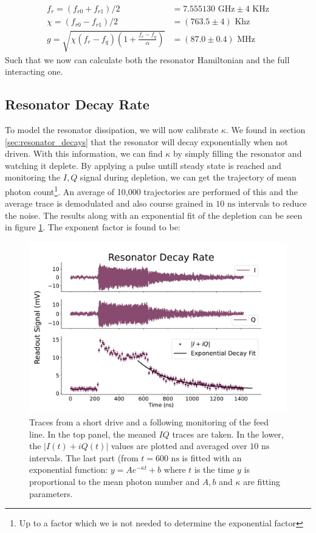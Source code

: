 \begin{align}
    f_r  = (f_{r0} + f_{r1}) / 2 &= 7.555130 \text{ GHz} \pm 4 \text{ KHz} \\
    \chi = (f_{r0} - f_{r1}) / 2 &= (763.5 \pm 4) \text{ Khz}  \label{eq:dispersive_shift}\\
    g    = \sqrt{\chi (f_r - f_q)\left(1 + \frac{f_r - f_q}{\alpha}\right)} &= (87.0 \pm 0.4) \text{ MHz}
\end{align}
Such that we now can calculate both the resonator Hamiltonian and the full interacting one.

\subsection{Resonator Decay Rate}
To model the resonator dissipation, we will now calibrate $\kappa$. We found in section \ref{sec:resonator_decays} that the resonator will decay exponentially when not driven. With this information, we can find $\kappa$ by simply filling the resonator and watching it deplete. By applying a pulse untill steady state is reached and monitoring the $I, Q$ signal during depletion, we can get the trajectory of mean photon count\footnote{Up to a factor which we is not needed to determine the exponential factor}. An average of 10,000 trajectories are performed of this and the average trace is demodulated and also course grained in $10 \text{ ns}$ intervals to reduce the noise. The results along with an exponential fit of the depletion can be seen in figure \ref{fig:calibration_of_kappa}. The exponent factor is found to be:
\begin{figure}[h]
    \centering
    \includegraphics{Calibrations/Figures/Resonator Decay Rate.pdf}
    \caption{Traces from a short drive and a following monitoring of the feed line. In the top panel, the meaned $IQ$ traces are taken. In the lower, the $|I(t) + iQ(t)|$ values are plotted and averaged over $10 \text{ ns}$ intervals. The last part (from $t = 600 \text{ ns}$ is fitted with an exponential function: $y = Ae^{-\kappa t} + b$ where $t$ is the time $y$ is proportional to the mean photon number and $A, b$ and $\kappa$ are fitting parameters.}
    \label{fig:calibration_of_kappa}
\end{figure}
